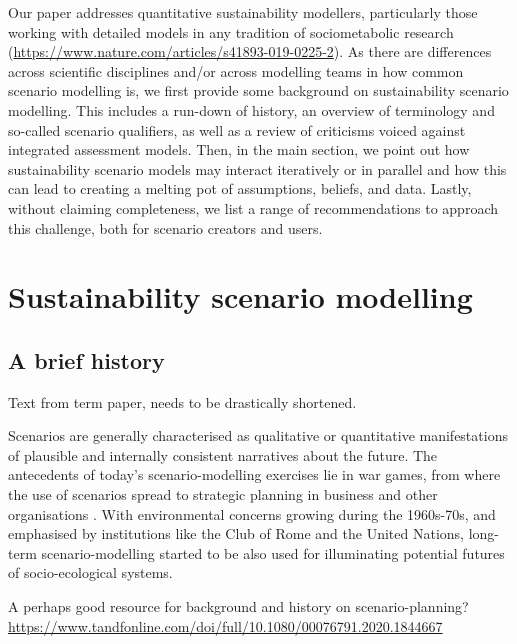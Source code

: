 \documentclass{article}
\begin{document}
\begin{refsection}
Our paper addresses quantitative sustainability modellers, particularly those working with detailed models in any tradition of sociometabolic research (\url{https://www.nature.com/articles/s41893-019-0225-2}). As there are differences across scientific disciplines and/or across modelling teams in how common scenario modelling is, we first provide some background on sustainability scenario modelling. This includes a run-down of history, an overview of terminology and so-called scenario qualifiers, as well as a review of criticisms voiced against integrated assessment models.
Then, in the main section, we point out how sustainability scenario models may interact iteratively or in parallel and how this can lead to creating a melting pot of assumptions, beliefs, and data.
Lastly, without claiming completeness, we list a range of recommendations to approach this challenge, both for scenario creators and users.


\section{Sustainability scenario modelling}

\subsection{A brief history}
Text from term paper, needs to be drastically shortened.

Scenarios are generally characterised as qualitative or quantitative manifestations of plausible and internally consistent narratives about the future. The antecedents of today's scenario-modelling exercises lie in war games, from where the use of scenarios spread to strategic planning in business and other organisations \parencite{bradfield_2005,schoemaker_1993}.\footnotemark{} With environmental concerns growing during the 1960s-70s, and emphasised by institutions like the Club of Rome and the United Nations, long-term scenario-modelling started to be also used for illuminating potential futures of socio-ecological systems.

A perhaps good resource for background and history on scenario-planning? \url{https://www.tandfonline.com/doi/full/10.1080/00076791.2020.1844667}



\end{refsection}
\end{document}

